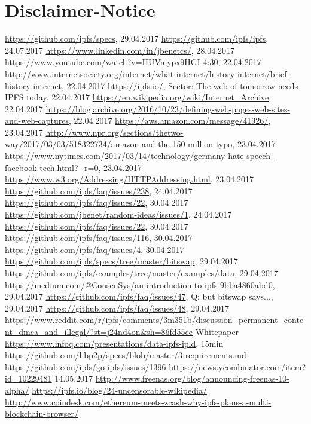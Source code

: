 \documentclass[a4paper,11pt, oneside]{report}
\theoremstyle{definition}
\begin{document}
\chapter{Disclaimer-Notice}



\begin{thebibliography}{1}
 \url{https://github.com/ipfs/specs}, 29.04.2017
 \url{https://github.com/ipfs/ipfs}, 24.07.2017
 \url{https://www.linkedin.com/in/jbenetcs/}, 28.04.2017
 \url{https://www.youtube.com/watch?v=HUVmypx9HGI} 4:30, 22.04.2017
 \url{http://www.internetsociety.org/internet/what-internet/history-internet/brief-history-internet}, 22.04.2017
 \url{https://ipfs.io/}, Sector: The web of tomorrow needs IPFS today, 22.04.2017
 \url{https://en.wikipedia.org/wiki/Internet_Archive}, 22.04.2017
 \url{https://blog.archive.org/2016/10/23/defining-web-pages-web-sites-and-web-captures}, 22.04.2017
 \url{https://aws.amazon.com/message/41926/}, 23.04.2017
 \url{http://www.npr.org/sections/thetwo-way/2017/03/03/518322734/amazon-and-the-150-million-typo}, 23.04.2017
 \url{https://www.nytimes.com/2017/03/14/technology/germany-hate-speech-facebook-tech.html?_r=0}, 23.04.2017
 \url{https://www.w3.org/Addressing/HTTPAddressing.html}, 23.04.2017 
\url{https://github.com/ipfs/faq/issues/238}, 24.04.2017
 \url{https://github.com/ipfs/faq/issues/22}, 30.04.2017
 \url{https://github.com/jbenet/random-ideas/issues/1}, 24.04.2017
 \url{https://github.com/ipfs/faq/issues/22}, 30.04.2017
 \url{https://github.com/ipfs/faq/issues/116}, 30.04.2017
 \url{https://github.com/ipfs/faq/issues/4}, 30.04.2017
 \url{https://github.com/ipfs/specs/tree/master/bitswap}, 29.04.2017
 \url{https://github.com/ipfs/examples/tree/master/examples/data}, 29.04.2017
 \url{https://medium.com/@ConsenSys/an-introduction-to-ipfs-9bba4860abd0}, 29.04.2017
 \url{https://github.com/ipfs/faq/issues/47}, Q: but bitswap says..., 29.04.2017
 \url{https://github.com/ipfs/faq/issues/48}, 29.04.2017
\url{https://www.reddit.com/r/ipfs/comments/3m351b/discussion_permanent_content_dmca_and_illegal/?st=j24nd4on&sh=86fd55ce}
 Whitepaper
 \url{https://www.infoq.com/presentations/data-ipfs-ipld}, 15min
 \url{https://github.com/libp2p/specs/blob/master/3-requirements.md} 
  \url{https://github.com/ipfs/go-ipfs/issues/1396}
 \url{https://news.ycombinator.com/item?id=10229481} 14.05.2017
 \url{}
 \url{http://www.freenas.org/blog/announcing-freenas-10-alpha/}
 \url{https://ipfs.io/blog/24-uncensorable-wikipedia/}
 \url{http://www.coindesk.com/ethereum-meets-zcash-why-ipfs-plans-a-multi-blockchain-browser/}

\end{thebibliography}


\printglossaries

\listoffigures
\end{document}
